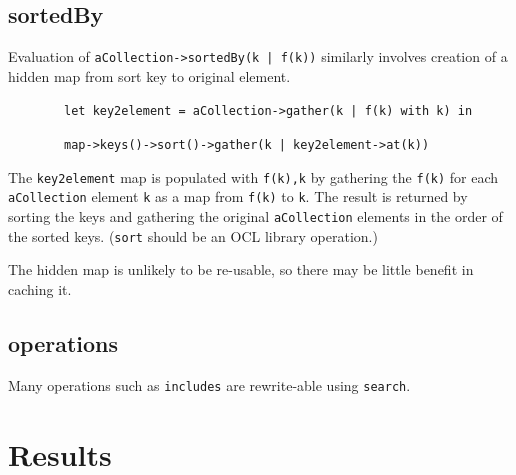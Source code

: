 \documentclass[
]{ceurart}
\begin{document}
\subsection{sortedBy}

Evaluation of \verb!aCollection->sortedBy(k | f(k))! similarly involves creation of a hidden map from sort key to original element.

\begin{description}[itemsep=-0.2cm]\vspace{-10pt}\small\begin{samepage}
\item ~~~~~~~~\verb!let key2element = aCollection->gather(k | f(k) with k) in!
\item ~~~~~~~~\verb!map->keys()->sort()->gather(k | key2element->at(k))!
\end{samepage}\vspace{-10pt}\end{description}

The \verb!key2element! map is populated with \verb!f(k),k! by gathering the \verb!f(k)! for each \verb!aCollection! element  \verb!k! as a map from \verb!f(k)! to \verb!k!. The result is returned by sorting the keys and gathering the original \verb!aCollection! elements in the order of the sorted keys. (\verb!sort! should be an OCL library operation.)

The hidden map is unlikely to be re-usable, so there may be little benefit in caching it. 

\subsection{operations}

Many operations such as \verb!includes! are rewrite-able using \verb!search!.

\section{Results}\label{Results}
\end{document}
